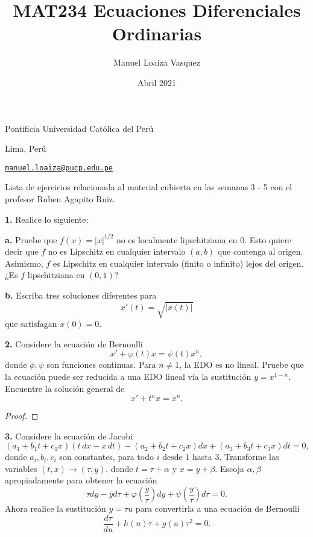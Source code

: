 \documentclass{article}
\title{MAT234 Ecuaciones Diferenciales Ordinarias}
\author{Manuel Loaiza Vasquez}
\date{Abril 2021}
\newenvironment{statement}[1]{\smallskip\noindent\color[rgb]{1.00,0.00,0.50} {\bf #1.}}{}
\theoremstyle{definition}
\theoremstyle{remark}
\begin{document}
\maketitle

\vspace*{-0.25in}
\centerline{Pontificia Universidad Cat\'olica del Per\'u}
\centerline{Lima, Per\'u}
\centerline{\href{mailto:manuel.loaiza@pucp.edu.pe}{{\tt manuel.loaiza@pucp.edu.pe}}}
\vspace*{0.15in}

\begin{framed}
  Lista de ejercicios relacionada al material cubierto en las semanas 3 - 5 con
  el profesor Ruben Agapito Ruiz.
\end{framed}

\begin{statement}{1}
  Realice lo siguiente:
\end{statement}

\begin{statement}{a}
  Pruebe que $f(x) = |x|^{1 / 2}$ no es localmente lipschitziana en $0$.
  Esto quiere decir que $f$ no es Lipschitz en cualquier intervalo $(a, b)$ que
  contenga al origen.
  Asimismo, $f$ es Lipschitz en cualquier intervalo (finito o infinito) lejos
  del origen.
  ¿Es $f$ lipschitziana en $(0, 1)$?
\end{statement}

\begin{statement}{b}
  Escriba tres soluciones diferentes para
  \[
    x'(t) = \sqrt{|x(t)|}
  \]
  que satisfagan $x(0) = 0$.
\end{statement}

\begin{statement}{2}
  Considere la ecuaci\'on de Bernoulli
  \[
    x' + \varphi(t) x = \psi(t) x^n,
  \]
  donde $\phi, \psi$ son funciones continuas.
  Para $n \neq 1$, la EDO es no lineal.
  Pruebe que la ecuaci\'on puede ser reducida a una EDO lineal v\'ia la
  sustituci\'on $y = x^{1 - n}$. Encuentre la soluci\'on general de
  \[
    x' + t^n x = x^n.  
  \]
\end{statement}

\begin{proof}
  
\end{proof}

\begin{statement}{3}
  Considere la ecuaci\'on de Jacobi
  \[
    (a_1 + b_1 t + c_1 x) (t \, dx - x \, dt) - (a_2 + b_2 t + c_2 x) dx + (a_3 + b_3 t + c_3 x) dt = 0,  
  \]
  donde $a_i, b_i, c_i$ son constantes, para todo $i$ desde $1$ hasta $3$.
  Transforme las variables $(t, x) \to (\tau, y)$, donde
  $t = \tau + \alpha$ y $x = y + \beta$.
  Escoja $\alpha, \beta$ apropiadamente para obtener la ecuaci\'on
  \[
    \tau dy - y d \tau   + \varphi\left(\frac{y}{\tau}\right) dy +
    \psi\left(\frac{y}{\tau}\right) d\tau = 0.
  \]
  Ahora realice la sustituci\'on $y = \tau u$ para convertirla a una ecuaci\'on
  de Bernoulli
  \[
    \frac{d \tau}{du} + h(u) \tau + g(u) \tau^2 = 0.
  \]
\end{statement}
\end{document}

